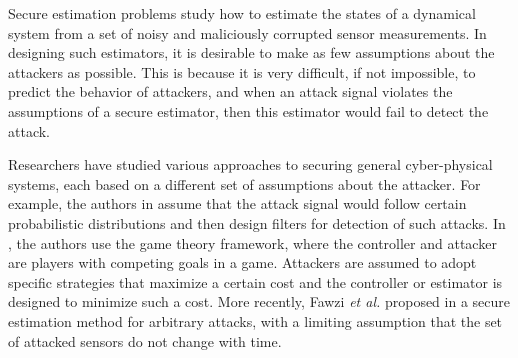 \documentclass[12pt, conference, a4paper, twoside]{IEEEconf_mod}
\begin{document}

Secure estimation problems study how to estimate the states of a dynamical system from a set of noisy and maliciously corrupted sensor measurements. 
In designing such estimators, it is desirable to make as few assumptions about the attackers as possible. This is because it is very difficult, if not impossible, to predict the behavior of attackers, and when an attack signal violates the assumptions of a secure estimator, then this estimator would fail to detect the attack.

Researchers have studied various approaches to securing general cyber-physical systems, each based on a different set of assumptions about the attacker.
For example, the authors in \cite{Bullo, Liu} assume that the attack signal would follow certain probabilistic distributions and then design filters for detection of such attacks. 
In \cite{Wu, Basar, Basar2, Walrand, Pappas}, the authors use the game theory framework, where the controller and attacker are players with competing goals in a game. Attackers are assumed to adopt specific strategies that maximize a certain cost and the controller or estimator is designed to minimize such a cost.
More recently, Fawzi \textit{et al.} proposed in \cite{Fawzi2014} a secure estimation method for arbitrary attacks, with a limiting assumption that the set of attacked sensors do not change with time. 
\end{document}
